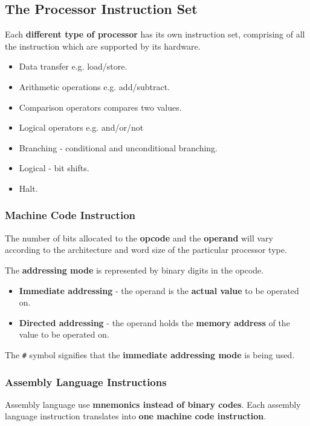 \subsection{The Processor Instruction Set}

Each \textbf{different type of processor} has its own instruction set, comprising of all the instruction which are supported by its hardware.
\begin{itemize}
    \item Data transfer e.g. load/store.
    \item Arithmetic operations e.g. add/subtract.
    \item Comparison operators compares two values.
    \item Logical operators e.g. and/or/not
    \item Branching - conditional and unconditional branching.
    \item Logical - bit shifts.
    \item Halt.
\end{itemize}

\subsubsection*{Machine Code Instruction}

The number of bits allocated to the \textbf{opcode} and the \textbf{operand} will vary according to the architecture and word size of the particular processor type.

The \textbf{addressing mode} is represented by binary digits in the opcode.
\begin{itemize}
    \item \textbf{Immediate addressing} - the operand is the \textbf{actual value} to be operated on.
    \item \textbf{Directed addressing} - the operand holds the \textbf{memory address} of the value to be operated on.
\end{itemize}

The \texttt{\#} symbol signifies that the \textbf{immediate addressing mode} is being used.

\subsubsection*{Assembly Language Instructions}

Assembly language use \textbf{mnemonics instead of binary codes}. Each assembly language instruction translates into \textbf{one machine code instruction}.
